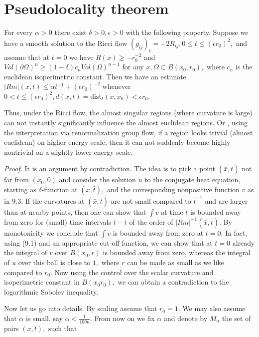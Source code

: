 \documentclass[12pt]{article}
\newcommand{\e}{\epsilon}
\theoremstyle{plain}
{\swapnumbers
\newtheorem{thm}{Theorem}[section]
\newtheorem{cor}[thm]{Corollary}
\newtheorem{lem}[thm]{Lemma}
\newtheorem{prop}[thm]{Proposition}
}
\theoremstyle{definition}
{\swapnumbers
\newtheorem{defn}[thm]{Definition}
\newtheorem{nota}[thm]{Notation}
\newtheorem{parag}[thm]{}
\newtheorem*{parstr}{\addtocounter{thm}{1}\thesection.\arabic{thm}*}
\newtheorem*{intropar}{\addtocounter{thm}{1}\arabic{thm}}
}
\theoremstyle{remark} {\swapnumbers
\newtheorem{rem}[thm]{Remark}
\newtheorem{exam}[thm]{Example}
\newtheorem{lemma}[thm]{Lemma}
\newtheorem{claim}[thm]{Claim}
}
\numberwithin{equation}{section}
\begin{document}
   \section { Pseudolocality theorem}
 \begin{thm}  For every $\alpha>0$ there exist
 $\delta>0,\epsilon>0$ with the following property. Suppose we
 have a smooth solution to the Ricci flow $(g_{ij})_t=-2R_{ij},
 0\le t\le (\epsilon r_0)^2,$ and assume that at $t=0$ we have
 $R(x)\ge -r_0^{-2}$ and
 $Vol(\partial\Omega)^n\ge(1-\delta)c_nVol(\Omega)^{n-1}$ for any
 $x,\Omega\subset B(x_0,r_0),$ where $c_n$ is the euclidean
 isoperimetric constant. Then we have an estimate $|Rm|(x,t)\le
 \alpha t^{-1}+(\e r_0)^{-2}$ whenever $0<t\le (\epsilon
 r_0)^2, d(x,t)=\mbox{dist}_t(x,x_0)<\epsilon r_0.$ \end{thm} Thus,
 under the Ricci flow, the almost singular regions (where
 curvature is large) can not instantly significantly influence the
 almost euclidean regions. Or , using the interpretation via
 renormalization group flow, if a region looks trivial (almost
 euclidean) on higher energy scale, then it can not suddenly
 become highly nontrivial on a slightly lower energy scale.
 \par {\it Proof. }
 It is an argument by contradiction. The idea is to pick a
 point $(\bar{x},\bar{t})$ not far from $(x_0,0)$ and consider the
 solution $u$ to the conjugate heat equation, starting as
 $\delta$-function at $(\bar{x},\bar{t}),$ and the corresponding
 nonpositive function $v$ as in 9.3. If the curvatures at
 $(\bar{x},\bar{t})$ are not small compared to $\bar{t}^{-1}$ and
 are larger than at nearby points, then one can show that
 $\int{v}$  at time $t$ is bounded away from zero for (small) time intervals
 $\bar{t}-t$ of the order of $|Rm|^{-1}(\bar{x},\bar{t}).$ By
 monotonicity we conclude that $\int{v}$ is bounded away from zero
 at $t=0.$ In fact, using (9.1) and an appropriate cut-off
 function, we can show that at $t=0$ already the integral of $v$
 over $B(x_0,r)$ is bounded away from zero, whereas the integral
 of $u$ over this ball is close to $1,$ where $r$ can be made as
 small as we like compared to $r_0.$ Now using the control over
 the scalar curvature and isoperimetric constant in $B(x_0r_0),$
 we can obtain a contradiction to the logarithmic Sobolev
 inequality. \par Now let us go into details. By scaling assume
 that $r_0=1.$ We may also assume that $\alpha$ is small, say
 $\alpha<\frac{1}{100n}.$ From now on we fix $\alpha$ and denote
 by $M_{\alpha}$ the set of pairs $(x,t),$ such that
\end{document}
